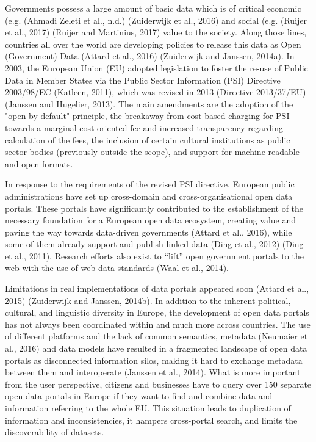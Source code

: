 \documentclass[<options>]{elsarticle}
\begin{document}
Governments possess a large amount of basic data which is of critical economic (e.g. (Ahmadi Zeleti et al., n.d.) (Zuiderwijk et al., 2016) and social (e.g. (Ruijer et al., 2017) (Ruijer and Martinius, 2017) value to the society. Along those lines, countries all over the world are developing policies to release this data as Open (Government) Data (Attard et al., 2016) (Zuiderwijk and Janssen, 2014a). In 2003, the European Union (EU) adopted legislation to foster the re-use of Public Data in Member States via the Public Sector Information (PSI) Directive 2003/98/EC (Katleen, 2011), which was revised in 2013 (Directive 2013/37/EU) (Janssen and Hugelier, 2013). The main amendments are the adoption of the "open by default" principle, the breakaway from cost-based charging for PSI towards a marginal cost-oriented fee and increased transparency regarding calculation of the fees, the inclusion of certain cultural institutions as public sector bodies (previously outside the scope), and support for machine-readable and open formats.

In response to the requirements of the revised PSI directive, European public administrations have set up cross-domain and cross-organisational open data portals. These portals have significantly contributed to the establishment of the necessary foundation for a European open data ecosystem, creating value and paving the way towards data-driven governments (Attard et al., 2016), while some of them already support and publish linked data (Ding et al., 2012)  (Ding et al., 2011). Research efforts also exist to “lift” open government portals to the web with the use of web data standards (Waal et al., 2014).

Limitations in real implementations of data portals appeared soon (Attard et al., 2015) (Zuiderwijk and Janssen, 2014b). In addition to the inherent political, cultural, and linguistic diversity in Europe, the development of open data portals has not always been coordinated within and much more across countries. The use of different platforms and the lack of common semantics, metadata (Neumaier et al., 2016) and data models have resulted in a fragmented landscape of open data portals as disconnected information silos, making it hard to exchange metadata between them and interoperate (Janssen et al., 2014). What is more important from the user perspective, citizens and businesses have to query over 150 separate open data portals in Europe if they want to find and combine data and information referring to the whole EU. This situation leads to duplication of information and inconsistencies, it hampers cross-portal search, and limits the discoverability of datasets.
\end{document}
